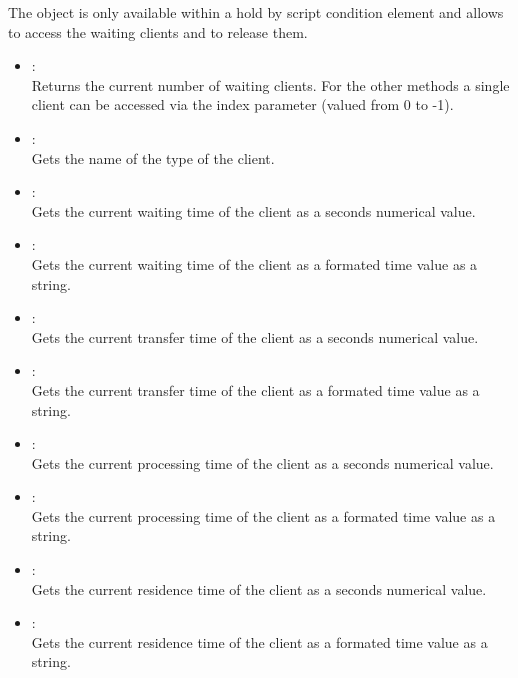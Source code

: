 The  object is only available within a hold by script condition element
and allows to access the waiting clients and to release them.

\begin{itemize}

\item
{}:\\
Returns the current number of waiting clients. For the other
methods a single client can be accessed via the index parameter
(valued from 0 to -1).

\item
{}:\\
Gets the name of the type of the client.

\item
{}:\\
Gets the current waiting time of the client as a seconds numerical value.

\item
{}:\\
Gets the current waiting time of the client as a formated time value as a string.

\item
{}:\\
Gets the current transfer time of the client as a seconds numerical value.

\item
{}:\\
Gets the current transfer time of the client as a formated time value as a string.

\item
{}:\\
Gets the current processing time of the client as a seconds numerical value.

\item
{}:\\
Gets the current processing time of the client as a formated time value as a string.

\item
{}:\\
Gets the current residence time of the client as a seconds numerical value.

\item
{}:\\
Gets the current residence time of the client as a formated time value as a string.


\end{itemize}
